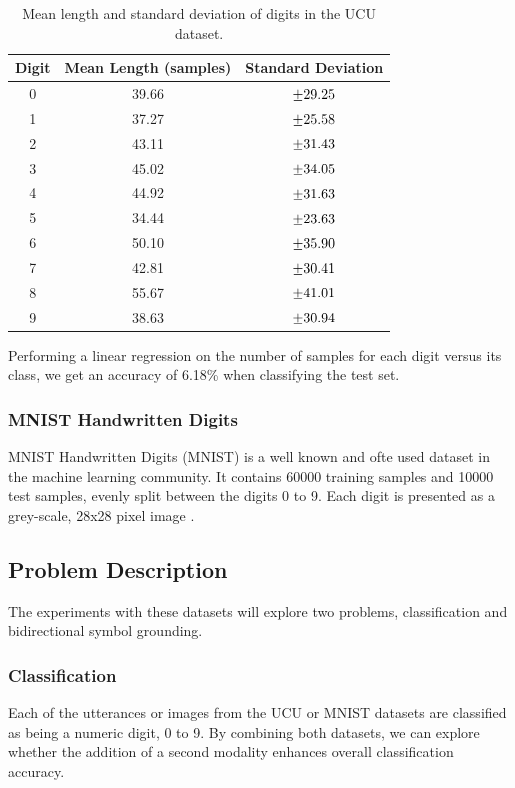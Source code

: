 	\begin{table}
		\centering
		\begin{tabular}{|c|c|c|}
			\hline
			Digit & Mean Length (samples) & Standard Deviation \\ \hline
			0 & 39.66 & $\mypm 29.25$ \\ \hline
			1 & 37.27 & $\mypm 25.58$ \\ \hline
			2 & 43.11 & $\mypm 31.43$ \\ \hline
			3 & 45.02 & $\mypm 34.05$ \\ \hline
			4 & 44.92 & $\mypm 31.63$ \\ \hline
			5 & 34.44 & $\mypm 23.63$ \\ \hline
			6 & 50.10 & $\mypm 35.90$ \\ \hline
			7 & 42.81 & $\mypm 30.41$ \\ \hline
			8 & 55.67 & $\mypm 41.01$ \\ \hline
			9 & 38.63 & $\mypm 30.94$ \\ \hline

		\end{tabular}
		\caption{Mean length and standard deviation of digits in the UCU dataset.}
		\label{tab:UCU_sampLen}
	\end{table}


Performing a linear regression on the number of samples for each digit versus its class, we get an accuracy of 6.18\% when classifying the test set.

\subsubsection{MNIST Handwritten Digits}
MNIST Handwritten Digits (MNIST) is a well known and ofte used dataset in the machine learning community. It contains 60000 training samples and 10000 test samples, evenly split between the digits 0 to 9. 
Each digit is presented as a grey-scale, 28x28 pixel image \cite{lecun1998mnist}. 

\subsection{Problem Description}
The experiments with these datasets will explore two problems, classification and bidirectional symbol grounding. 

\subsubsection{Classification}
Each of the utterances or images from the UCU or MNIST datasets are classified as being a numeric digit, 0 to 9. By combining both datasets, we can explore whether the addition of a second modality enhances overall classification accuracy.

